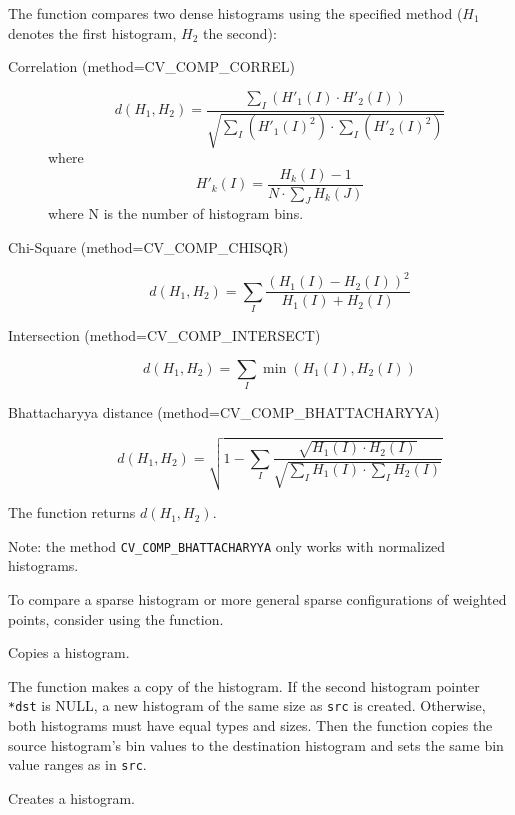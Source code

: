 The function compares two dense histograms using the specified method ($H_1$ denotes the first histogram, $H_2$ the second):

\begin{description}
\item[Correlation (method=CV\_COMP\_CORREL)]
\[
d(H_1,H_2) = \frac
{\sum_I (H'_1(I) \cdot H'_2(I))}
{\sqrt{\sum_I(H'_1(I)^2) \cdot \sum_I(H'_2(I)^2)}}
\]
where
\[
H'_k(I) = \frac{H_k(I) - 1}{N \cdot \sum_J H_k(J)}
\]
where N is the number of histogram bins.

\item[Chi-Square (method=CV\_COMP\_CHISQR)]
\[ d(H_1,H_2) = \sum_I \frac{(H_1(I)-H_2(I))^2}{H_1(I)+H_2(I)} \]

\item[Intersection (method=CV\_COMP\_INTERSECT)]
\[ d(H_1,H_2) = \sum_I \min (H_1(I), H_2(I)) \]

\item[Bhattacharyya distance (method=CV\_COMP\_BHATTACHARYYA)]
\[ d(H_1,H_2) = \sqrt{1 - \sum_I \frac{\sqrt{H_1(I) \cdot H_2(I)}}{ \sqrt{ \sum_I H_1(I) \cdot \sum_I H_2(I) }}} \]

\end{description}

The function returns $d(H_1, H_2)$.

Note: the method \texttt{CV\_COMP\_BHATTACHARYYA} only works with normalized histograms.

To compare a sparse histogram or more general sparse configurations of weighted points, consider using the  function.

\ifC
{}
Copies a histogram.


\begin{description}
\end{description}

The function makes a copy of the histogram. If the
second histogram pointer \texttt{*dst} is NULL, a new histogram of the
same size as \texttt{src} is created. Otherwise, both histograms must
have equal types and sizes. Then the function copies the source histogram's
bin values to the destination histogram and sets the same bin value ranges
as in \texttt{src}.

\fi

Creates a histogram.

